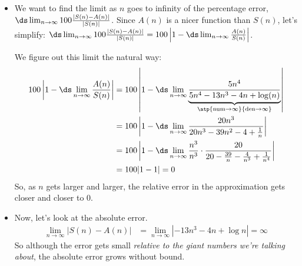 \begin{answer}
\begin{itemize}
\item We want to find the limit as $n$ goes to infinity of the percentage error,
$\ds\lim_{n \rightarrow \infty} 100\frac{|S(n)-A(n)|}{|S(n)|}$. Since $A(n)$ is a nicer function than $S(n)$, let's simplify: $\ds\lim_{n \rightarrow \infty} 100\frac{|S(n)-A(n)|}{|S(n)|} = 100\left|1-\ds\lim_{n \to \infty}\frac{A(n)}{S(n)}\right|$.

We  figure out this limit the natural way:
\begin{align*}
100\left|1-\ds\lim_{n \to \infty}\frac{A(n)}{S(n)}\right|&=
100\left|1-\ds\lim_{n \rightarrow \infty}\underbrace{\frac{5n^4}{5n^4-13n^3-4n+\log (n)}}_{\atp
	{\mathrm{num}\to\infty}
	{\mathrm{den}\to\infty}}\right|\\
&=
100\left|1-\ds\lim_{n \rightarrow \infty}\frac{20n^3}{20n^3-39n^2-4+\frac{1}{n}}\right|\\
&=
100\left|1-\ds\lim_{n \rightarrow \infty}\frac{n^3}{n^3}\cdot\frac{20}{20-\frac{39}{n}-\frac{4}{n^3}+\frac{1}{n^4}}\right|\\
&=100|1-1|=0
\end{align*}
So, as $n$ gets larger and larger, the relative error in the approximation gets closer and closer to 0.

\item Now, let's look at the absolute error.
\begin{align*}
\lim_{n \rightarrow \infty} \left| S(n)-A(n)\right|&=\lim_{n \rightarrow \infty} |-13n^3-4n+\log n|=\infty
\end{align*}
So although the error gets small \emph{relative to the giant numbers we're talking about}, the absolute error grows without bound.
\end{itemize}
\end{answer}
